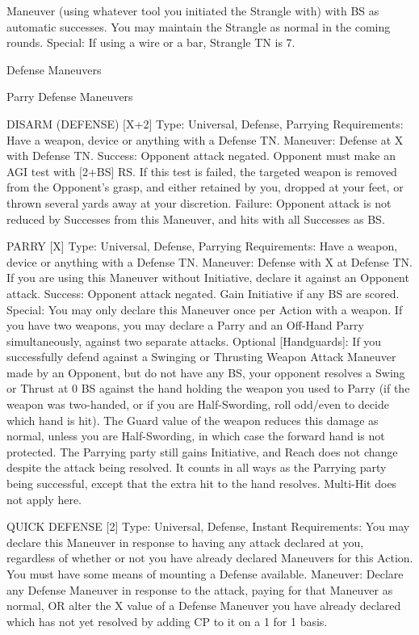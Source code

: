 \documentclass[oneside,11pt,english]{book}
\begin{document}
Maneuver (using whatever tool you initiated the Strangle with) with BS as automatic successes. You may 
maintain the Strangle as normal in the coming rounds. 
Special: If using a wire or a bar, Strangle TN is 7. 

 

 

Defense Maneuvers 

 

Parry Defense Maneuvers 

 

DISARM (DEFENSE) [X+2] 
Type: Universal, Defense, Parrying 
Requirements: Have a weapon, device or anything with a Defense TN. 
Maneuver: Defense at X with Defense TN. 
Success: Opponent attack negated. Opponent must make an AGI test with [2+BS] RS. If this test is failed, 
the targeted weapon is removed from the Opponent's grasp, and either retained by you, dropped at your 
feet, or thrown several yards away at your discretion. 
Failure: Opponent attack is not reduced by Successes from this Maneuver, and hits with all Successes as 
BS. 

 

PARRY [X] 
Type: Universal, Defense, Parrying 
Requirements: Have a weapon, device or anything with a Defense TN. 
Maneuver: Defense with X at Defense TN. If you are using this Maneuver without Initiative, declare it 
against an Opponent attack. 
Success: Opponent attack negated. Gain Initiative if any BS are scored. 
Special: You may only declare this Maneuver once per Action with a weapon. If you have two weapons, 
you may declare a Parry and an Off-Hand Parry simultaneously, against two separate attacks. 
Optional [Handguards]: If you successfully defend against a Swinging or Thrusting Weapon Attack 
Maneuver made by an Opponent, but do not have any BS, your opponent resolves a Swing or Thrust at 0 
BS against the hand holding the weapon you used to Parry (if the weapon was two-handed, or if you are 
Half-Swording, roll odd/even to decide which hand is hit). The Guard value of the weapon reduces this 
damage as normal, unless you are Half-Swording, in which case the forward hand is not protected. The 
Parrying party still gains Initiative, and Reach does not change despite the attack being resolved. It counts 
in all ways as the Parrying party being successful, except that the extra hit to the hand resolves. Multi-Hit 
does not apply here. 

 

QUICK DEFENSE [2] 
Type: Universal, Defense, Instant 
Requirements: You may declare this Maneuver in response to having any attack declared at you, 
regardless of whether or not you have already declared Maneuvers for this Action. You must have some 
means of mounting a Defense available. 
Maneuver: Declare any Defense Maneuver in response to the attack, paying for that Maneuver as 
normal, OR alter the X value of a Defense Maneuver you have already declared which has not yet 
resolved by adding CP to it on a 1 for 1 basis. 
\end{document}
